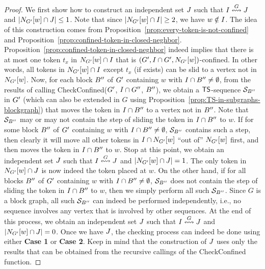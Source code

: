 \documentclass[a4paper]{llncs}
\begin{document}
\begin{proof}
\noindent
We first show how to construct an independent set $J$ such that $I \overset{G}{\leftrightsquigarrow} J$ and ${\left|N_{{G^\prime}}[w] \cap J\right|} \leq 1$.
Note that since ${\left|N_{{G^\prime}}[w] \cap I\right|} \geq 2$, we have $w \notin I$.
The idea of this construction comes from Proposition~\ref{prop:every-token-is-not-confined} and Proposition~\ref{prop:confined-token-in-closed-neghbor}.
Proposition~\ref{prop:confined-token-in-closed-neghbor} indeed implies that there is at most one token $t_x$ in $N_{{G^\prime}}[w] \cap I$ that is $({G^\prime}, I \cap {G^\prime}, N_{{G^\prime}}[w])$-confined.
In other words, all tokens in $N_{{G^\prime}}[w] \cap I$ except $t_x$ (if exists) can be slid to a vertex not in $N_{{G^\prime}}[w]$.
Now, for each block $B^{\prime\prime}$ of ${G^\prime}$ containing $w$ with $I \cap B^{\prime\prime} \neq \emptyset$, from the results of calling {\sc CheckConfined}(${G^\prime}$, $I \cap G^{\prime\prime}$, $B^{\prime\prime}$), 
	we obtain a ${\sf TS}$-sequence ${\cal S}_{B^{\prime\prime}}$ in ${G^\prime}$ (which can also be extended in $G$ using Proposition~\ref{prop:TS-in-subgraphs-blockgraph}) that moves the token in $I \cap B^{\prime\prime}$ to a vertex not in $B^{\prime\prime}$.
Note that ${\cal S}_{B^{\prime\prime}}$ may or may not contain the step of sliding the token in $I \cap B^{\prime\prime}$ to $w$.
If for some block $B^{\prime\prime}$ of ${G^\prime}$ containing $w$ with $I \cap B^{\prime\prime} \neq \emptyset$, ${\cal S}_{B^{\prime\prime}}$ contains such a step, then clearly it will move all other tokens in $I \cap N_{{G^\prime}}[w]$ ``out of'' $N_{{G^\prime}}[w]$ first,
	and then moves the token in $I \cap B^{\prime\prime}$ to $w$.
Stop at this point, we obtain an independent set $J$ such that $I \overset{G}{\leftrightsquigarrow} J$ and ${\left|N_{{G^\prime}}[w] \cap J\right|} = 1$.
The only token in $N_{{G^\prime}}[w] \cap J$ is now indeed the token placed at $w$. 
On the other hand, if for all blocks $B^{\prime\prime}$ of ${G^\prime}$ containing $w$ with $I \cap B^{\prime\prime} \neq \emptyset$, ${\cal S}_{B^{\prime\prime}}$ does not contain the step of sliding the token in $I \cap B^{\prime\prime}$ to $w$,
	then we simply perform all such ${\cal S}_{B^{\prime\prime}}$.
Since $G$ is a block graph, all such ${\cal S}_{B^{\prime\prime}}$ can indeed be performed independently, 
	i.e., no sequence involves any vertex that is involved by other sequences.
At the end of this process, we obtain an independent set $J$ such that $I \overset{G}{\leftrightsquigarrow} J$ and ${\left|N_{{G^\prime}}[w] \cap J\right|} = 0$.
Once we have $J$, the checking process can indeed be done using either \textbf{Case 1} or \textbf{Case 2}. 
Keep in mind that the construction of $J$ uses only the results that can be obtained from the recursive callings of the {\sc CheckConfined} function.


\end{proof}
\end{document}
